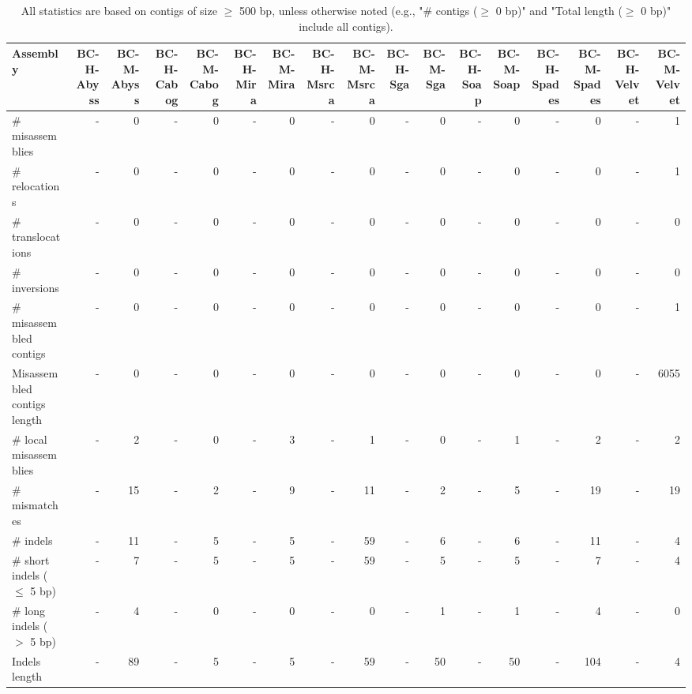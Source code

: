 \documentclass[12pt,a4paper]{article}
\begin{document}
\begin{table}[ht]
\begin{center}
\caption{All statistics are based on contigs of size $\geq$ 500 bp, unless otherwise noted (e.g., "\# contigs ($\geq$ 0 bp)" and "Total length ($\geq$ 0 bp)" include all contigs).}
\begin{tabular}{|l*{16}{|r}|}
\hline
Assembly & BC-H-Abyss & BC-M-Abyss & BC-H-Cabog & BC-M-Cabog & BC-H-Mira & BC-M-Mira & BC-H-Msrca & BC-M-Msrca & BC-H-Sga & BC-M-Sga & BC-H-Soap & BC-M-Soap & BC-H-Spades & BC-M-Spades & BC-H-Velvet & BC-M-Velvet \\ \hline
\# misassemblies & - & 0 & - & 0 & - & 0 & - & 0 & - & 0 & - & 0 & - & 0 & - & 1 \\ \hline
\hspace{5mm}\# relocations & - & 0 & - & 0 & - & 0 & - & 0 & - & 0 & - & 0 & - & 0 & - & 1 \\ \hline
\hspace{5mm}\# translocations & - & 0 & - & 0 & - & 0 & - & 0 & - & 0 & - & 0 & - & 0 & - & 0 \\ \hline
\hspace{5mm}\# inversions & - & 0 & - & 0 & - & 0 & - & 0 & - & 0 & - & 0 & - & 0 & - & 0 \\ \hline
\# misassembled contigs & - & 0 & - & 0 & - & 0 & - & 0 & - & 0 & - & 0 & - & 0 & - & 1 \\ \hline
Misassembled contigs length & - & 0 & - & 0 & - & 0 & - & 0 & - & 0 & - & 0 & - & 0 & - & 6055 \\ \hline
\# local misassemblies & - & 2 & - & 0 & - & 3 & - & 1 & - & 0 & - & 1 & - & 2 & - & 2 \\ \hline
\# mismatches & - & 15 & - & 2 & - & 9 & - & 11 & - & 2 & - & 5 & - & 19 & - & 19 \\ \hline
\# indels & - & 11 & - & 5 & - & 5 & - & 59 & - & 6 & - & 6 & - & 11 & - & 4 \\ \hline
\hspace{5mm}\# short indels ($\leq$ 5 bp) & - & 7 & - & 5 & - & 5 & - & 59 & - & 5 & - & 5 & - & 7 & - & 4 \\ \hline
\hspace{5mm}\# long indels ($>$ 5 bp) & - & 4 & - & 0 & - & 0 & - & 0 & - & 1 & - & 1 & - & 4 & - & 0 \\ \hline
Indels length & - & 89 & - & 5 & - & 5 & - & 59 & - & 50 & - & 50 & - & 104 & - & 4 \\ \hline
\end{tabular}
\end{center}
\end{table}
\end{document}
